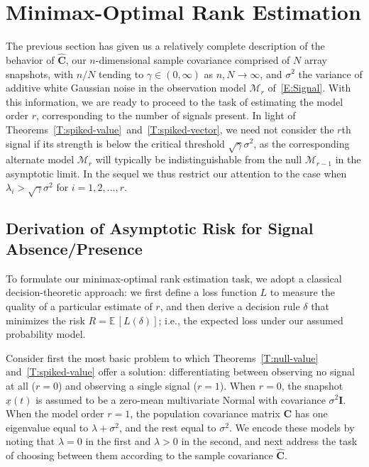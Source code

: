 \documentclass[final]{IEEEtran}
\newcommand{\vectorsymbol}{\underline}
\newcommand{\matrixsymbol}{\boldsymbol}
\newcommand{\mC}{\matrixsymbol{C}}
\newcommand{\mhC}{\widehat{\matrixsymbol{C}}}
\newcommand{\mI}{\matrixsymbol{I}}
\newcommand{\vx}{\vectorsymbol{x}}
\newcommand{\E}{\mathbb{E}}
\begin{document}
\section{Minimax-Optimal Rank Estimation}
\label{S:rank-est}

The previous section has given us a relatively complete description of the behavior of $\mhC$, our $n$-dimensional sample covariance comprised of $N$ array snapshots, with $n/N$ tending to $\gamma \in (0, \infty)$ as $n,N \to \infty$, and $\sigma^2$ the variance of additive white Gaussian noise in the observation model $\mathcal{M}_r$ of~\eqref{E:Signal}.  With this information, we are ready to proceed to the task of estimating the model order $r$, corresponding to the number of signals present.  In light of Theorems~\ref{T:spiked-value}~and~\ref{T:spiked-vector}, we need not consider the $r$th signal if its strength is below the critical threshold $\sqrt{\gamma} \sigma^2$, as the corresponding alternate model $\mathcal{M}_r$ will typically be indistinguishable from the null $\mathcal{M}_{r-1}$ in the asymptotic limit.  In the sequel we thus restrict our attention to the case when $\lambda_i > \sqrt{\gamma} \sigma^2$ for $i = 1, 2, \ldots, r$.

\subsection{Derivation of Asymptotic Risk for Signal Absence/Presence}

To formulate our minimax-optimal rank estimation task, we adopt a classical decision-theoretic approach: we first define a loss function $L$ to measure the quality of a particular estimate of $r$, and then derive a decision rule $\delta$ that minimizes the risk $R = \E \, [ L(\delta) ]$; i.e., the expected loss under our assumed probability model.

Consider first the most basic problem to which Theorems~\ref{T:null-value} and~\ref{T:spiked-value} offer a solution: differentiating between observing no signal at all ($r=0$) and observing a single signal ($r=1$).  When $r=0$, the snapshot $\vx(t)$ is assumed to be a zero-mean multivariate Normal with covariance $\sigma^2 \mI$. When the model order $r=1$, the population covariance matrix $\mC$ has one eigenvalue equal to $\lambda + \sigma^2$, and the rest equal to $\sigma^2$.  We encode these models by noting that $\lambda = 0$ in the first and $\lambda > 0$ in the second, and next address the task of choosing between them according to the sample covariance $\mhC$.
\end{document}
